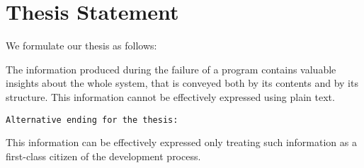 

\section{Thesis Statement}\label{sec:thesis}

We formulate our thesis as follows:

\begin{framed}
The information produced during the failure of a program contains valuable insights about the whole system, that is conveyed both by its contents and by its structure.
This information cannot be effectively expressed using plain text.
\end{framed}

\texttt{Alternative ending for the thesis:}
\begin{framed}
This information can be effectively expressed only treating such information as a first-class citizen of the development process.
\end{framed}











